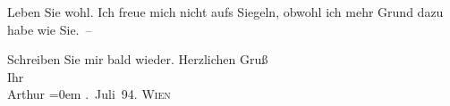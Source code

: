\pstart
           Leben Sie wohl. Ich freue {\pb}mich nicht aufs Siegeln, obwohl
          ich mehr Grund dazu habe wie Sie. –\pend
           
\pstart
           Schreiben Sie mir bald wieder. Herzlichen Gruß{\\[\baselineskip]}Ihr{\\[\baselineskip]}\spacefill\mbox{Arthur}\pend
           \leftskip=0em{}
. Juli 94. \textsc{Wien}\pend
           \endnumbering{}  \newcommand{\dateiname}{L00343}\newcommand{\titel}{Arthur Schnitzler an Richard Beer-Hofmann, 2. 7. 1894}\newcommand{\editorInnen}{Herausgegeben von Martin Anton Müller}
